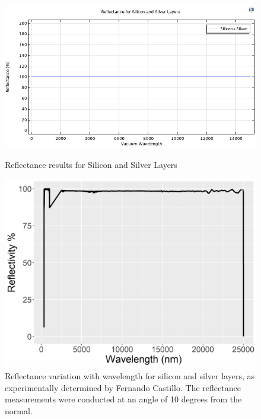 \begin{figure}[H]
  \centering
  \begin{minipage}{0.48\textwidth}
    \centering
    \includegraphics[width=\textwidth]{Chapters/Figures/Chapter 4 Figures/Silicon+Silver (Final Result).png}
    \caption{Reflectance results for Silicon and Silver Layers}
    \label{fig:Reflectance-Silicon-Silver}
  \end{minipage}\hfill
  \begin{minipage}{0.48\textwidth}
    \centering
    \includegraphics[width=\textwidth]{Chapters/Figures/Chapter 4 Figures/Silicon+Silver (Fernando's Results).png}
    \caption{Reflectance variation with wavelength for silicon and silver layers, as experimentally determined by Fernando Castillo. The reflectance measurements were conducted at an angle of 10 degrees from the normal.}
    \label{fig:Reflectance-Fernando-Results-Si-Ag}
  \end{minipage}
\end{figure}

